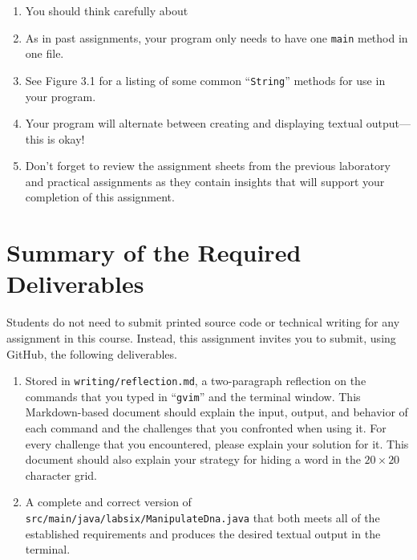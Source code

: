 \documentclass[11pt]{article}
\newcommand{\mainprogramsource}{\lstinline{src/main/java/labsix/ManipulateDna.java}}
\newcommand{\reflection}{\lstinline{writing/reflection.md}}
\newcommand{\command}[1]{``\lstinline{#1}''}
\begin{document}
\begin{enumerate}
  \setlength{\itemsep}{0pt}

\item You should think carefully about 

\item As in past assignments, your program only needs to have one {\tt main} method in one file.

\item See Figure 3.1 for a listing of some common \command{String} methods for use in your program.

\item Your program will alternate between creating and displaying textual output---this is okay!

\item Don't forget to review the assignment sheets from the previous laboratory and practical assignments as they
  contain insights that will support your completion of this assignment.

\end{enumerate}


\section*{Summary of the Required Deliverables}

\noindent Students do not need to submit printed source code or technical writing for any assignment in this course.
Instead, this assignment invites you to submit, using GitHub, the following deliverables.

\begin{enumerate}

  \setlength{\itemsep}{0in}

\item Stored in \reflection{}, a two-paragraph reflection on the commands that you typed in \command{gvim} and the
  terminal window. This Markdown-based document should explain the input, output, and behavior of each command and the
  challenges that you confronted when using it. For every challenge that you encountered, please explain your solution
  for it. This document should also explain your strategy for hiding a word in the $20 \times 20$ character grid.

\item A complete and correct version of \mainprogramsource{} that both meets all of the established requirements and
  produces the desired textual output in the terminal.

\end{enumerate}
\end{document}
